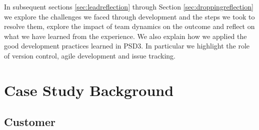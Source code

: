\documentclass{l3proj}
\begin{document}
In subsequent sections \ref{sec:leadreflection} through Section \ref{sec:droppingreflection} we explore the challenges we faced through development and the steps we took to resolve them, explore the impact of team dynamics on the outcome and reflect on what we have learned from the experience. We also explain how we applied the good development practices learned in PSD3. In particular we highlight the role of version control, agile development and issue tracking.

\newpage


\section{Case Study Background}
\label{sec:background}





\subsection{Customer}
\label{sec:customer}
\end{document}
